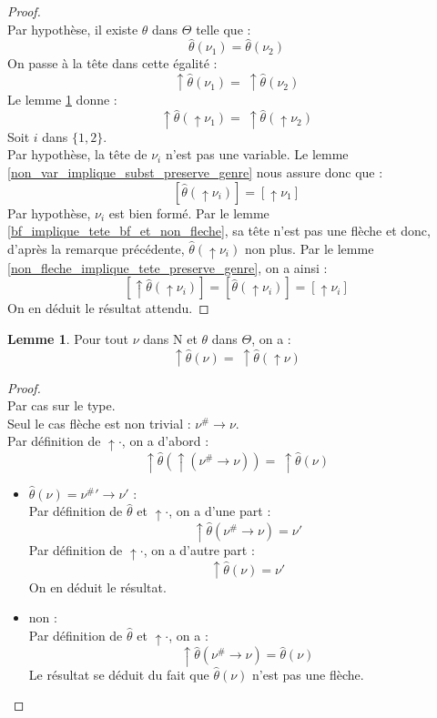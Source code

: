 \documentclass[a4paper]{report}
\newenvironment{preuve} 
  {\begin{proof}~\\} 
  {\end{proof}}
\theoremstyle{definition}
\newtheorem{lemme}[theoreme]{Lemme}
\newcommand{\N}{\mathrm{N}}
\begin{document}
\begin{preuve}
  Par hypothèse, il existe $\theta$ dans $\Theta$ telle que :
  \[ \hat\theta (\nu_1) = \hat\theta (\nu_2) \]
  On passe à la tête dans cette égalité :
  \[ \uparrow \hat\theta (\nu_1) =\ \uparrow \hat\theta (\nu_2) \]
  Le lemme \ref{tete_subst_eq_tete_subst_tete} donne :
  \[ \uparrow \hat\theta (\uparrow \nu_1) =\ \uparrow \hat\theta (\uparrow \nu_2) \]
  Soit $i$ dans $\{ 1, 2 \}$. \\
  Par hypothèse, la tête de $\nu_i$ n'est pas une variable. Le lemme \ref{non_var_implique_subst_preserve_genre} nous assure donc que :
  \[ [ \hat\theta (\uparrow \nu_i) ] = [ \uparrow \nu_1 ] \]
  Par hypothèse, $\nu_i$ est bien formé. Par le lemme \ref{bf_implique_tete_bf_et_non_fleche}, sa tête n'est pas une flèche et donc, d'après la remarque précédente, $\hat\theta (\uparrow \nu_i)$ non plus. Par le lemme \ref{non_fleche_implique_tete_preserve_genre}, on a ainsi :
  \[ [ \uparrow \hat\theta (\uparrow \nu_i) ] = [ \hat\theta (\uparrow \nu_i) ] = [ \uparrow \nu_i ] \]
  On en déduit le résultat attendu.
\end{preuve}

\begin{lemme} \label{tete_subst_eq_tete_subst_tete}
  Pour tout $\nu$ dans $\N$ et $\theta$ dans $\Theta$, on a :
  \[ \uparrow \hat\theta (\nu) =\ \uparrow \hat\theta (\uparrow \nu) \]
\end{lemme}

\begin{preuve}
  Par cas sur le type. \\
  Seul le cas flèche est non trivial : $\nu^\# \rightarrow \nu$. \\
  Par définition de $\uparrow \cdot$, on a d'abord :
  \[ \uparrow \hat\theta (\uparrow (\nu^\# \rightarrow \nu)) =\ \uparrow \hat\theta (\nu) \]
  \begin{itemize}[label={\textbf{Si}}]
    \item 
      $\hat\theta (\nu) = {\nu^\#}' \rightarrow \nu'$ : \\
      Par définition de $\hat\theta$ et $\uparrow \cdot$, on a d'une part :
      \[ \uparrow \hat\theta (\nu^\# \rightarrow \nu) = \nu' \]
      Par définition de $\uparrow \cdot$, on a d'autre part :
      \[ \uparrow \hat\theta (\nu) = \nu' \]
      On en déduit le résultat.
    \item 
      non : \\
      Par définition de $\hat\theta$ et $\uparrow \cdot$, on a :
      \[ \uparrow \hat\theta (\nu^\# \rightarrow \nu) = \hat\theta (\nu) \]
      Le résultat se déduit du fait que $\hat\theta (\nu)$ n'est pas une flèche.
  \end{itemize}
\end{preuve}
\end{document}

